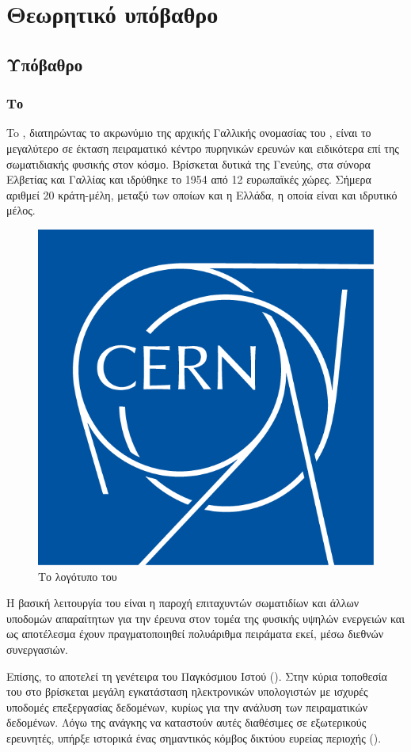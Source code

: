 \chapter{Θεωρητικό υπόβαθρο}

\section{Υπόβαθρο}
\subsection{Το }

To , διατηρώντας το ακρωνύμιο της αρχικής Γαλλικής ονομασίας του , είναι το μεγαλύτερο σε έκταση πειραματικό κέντρο πυρηνικών ερευνών και ειδικότερα επί της σωματιδιακής φυσικής στον κόσμο. 
Βρίσκεται δυτικά της Γενεύης, στα σύνορα Ελβετίας και Γαλλίας και ιδρύθηκε το 1954 από 12 ευρωπαϊκές χώρες. 
Σήμερα αριθμεί 20 κράτη-μέλη, μεταξύ των οποίων και η Ελλάδα, η οποία είναι και ιδρυτικό μέλος.

\begin{figure}[tph]
\includegraphics[width=0.25\linewidth]{images/CERNlogo}
\centering
\caption{Το λογότυπο του }
\label{img:CERNlogo}
\end{figure}

Η βασική λειτουργία του  είναι η παροχή επιταχυντών σωματιδίων και άλλων υποδομών απαραίτητων για την έρευνα στον τομέα της φυσικής υψηλών ενεργειών και ως αποτέλεσμα έχουν πραγματοποιηθεί πολυάριθμα πειράματα εκεί, μέσω διεθνών συνεργασιών.

Επίσης, το  αποτελεί τη γενέτειρα του Παγκόσμιου Ιστού ().
Στην κύρια τοποθεσία του στο  βρίσκεται μεγάλη εγκατάσταση ηλεκτρονικών υπολογιστών με ισχυρές υποδομές επεξεργασίας δεδομένων, κυρίως για την ανάλυση των πειραματικών δεδομένων. 
Λόγω της ανάγκης να καταστούν αυτές διαθέσιμες σε εξωτερικούς ερευνητές, υπήρξε ιστορικά ένας σημαντικός κόμβος δικτύου ευρείας περιοχής ().

